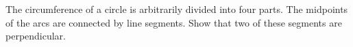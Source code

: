 \documentclass[varwidth]{standalone}
\begin{document}
    The circumference of a circle is arbitrarily divided into four parts. The midpoints of the arcs are connected by line segments. Show that two of these segments are perpendicular.
\end{document}
